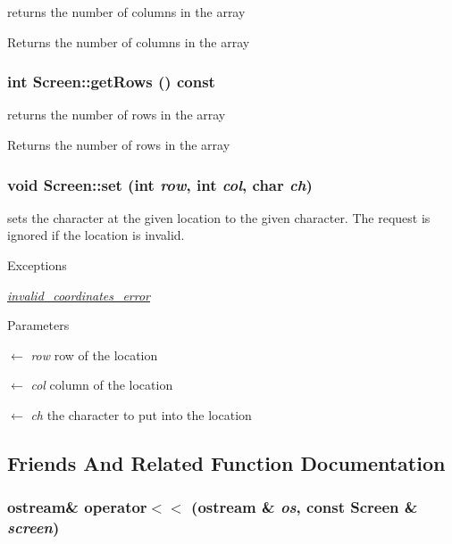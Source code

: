 returns the number of columns in the array \begin{DoxyReturn}{Returns}
the number of columns in the array 
\end{DoxyReturn}
\hypertarget{classScreen_a2d1cf1b84a49135a33aac9d7dc41af3a}{
\subsubsection[{getRows}]{\setlength{\rightskip}{0pt plus 5cm}int Screen::getRows () const}}
\label{classScreen_a2d1cf1b84a49135a33aac9d7dc41af3a}


returns the number of rows in the array \begin{DoxyReturn}{Returns}
the number of rows in the array 
\end{DoxyReturn}
\hypertarget{classScreen_ae19cdc0fab2d48c6bc947a78bb77b50a}{
\subsubsection[{set}]{\setlength{\rightskip}{0pt plus 5cm}void Screen::set (int {\em row}, \/  int {\em col}, \/  char {\em ch})}}
\label{classScreen_ae19cdc0fab2d48c6bc947a78bb77b50a}
sets the character at the given location to the given character. The request is ignored if the location is invalid. 
\begin{DoxyExceptions}{Exceptions}
\item[{\em \hyperlink{classinvalid__coordinates__error}{invalid\_\-coordinates\_\-error}}]\end{DoxyExceptions}

\begin{DoxyParams}{Parameters}
\item[\mbox{$\leftarrow$} {\em row}]row of the location \item[\mbox{$\leftarrow$} {\em col}]column of the location \item[\mbox{$\leftarrow$} {\em ch}]the character to put into the location \end{DoxyParams}


\subsection{Friends And Related Function Documentation}
\hypertarget{classScreen_aa0d87c1b28233bc47310fb992a0a648e}{
\subsubsection[{operator$<$$<$}]{\setlength{\rightskip}{0pt plus 5cm}ostream\& operator$<$$<$ (ostream \& {\em os}, \/  const {\bf Screen} \& {\em screen})}}
\label{classScreen_aa0d87c1b28233bc47310fb992a0a648e}


